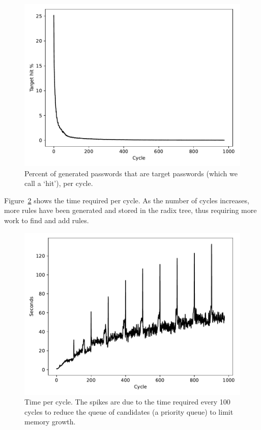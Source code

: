 \documentclass[letterpaper,twocolumn,10pt]{article}
\begin{document}
\begin{figure}[h]
\includegraphics[width=\linewidth]
{analysis/passwords-analysis/stats-hitpct.pdf}
\caption{Percent of generated passwords that are target passwords (which we
call a `hit'), per cycle.}
\label{fig:hitpct}
\end{figure}

Figure~\ref{fig:seconds} shows the time required per cycle. As the number of
cycles increases, more rules have been generated and stored in the radix tree,
thus requiring more work to find and add rules.

\begin{figure}[h]
\includegraphics[width=\linewidth]
{analysis/passwords-analysis/stats-seconds.pdf}
\caption{Time per cycle. The spikes are due to the time required every 100
cycles to reduce the queue of candidates (a priority queue) to limit memory
growth.}
\label{fig:seconds}
\end{figure}
\end{document}
